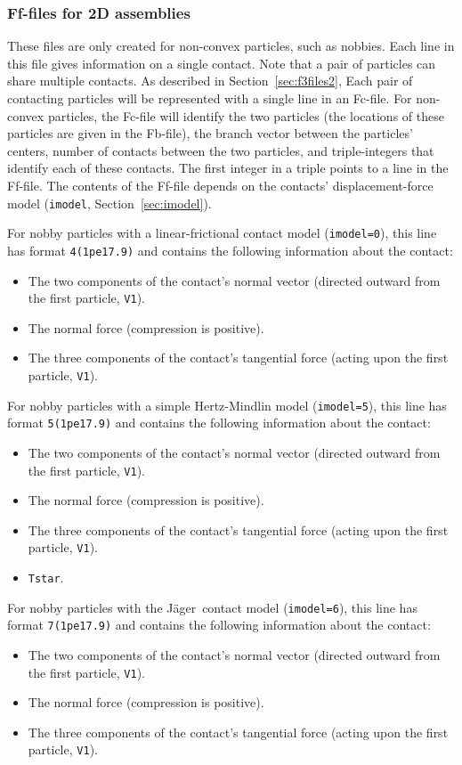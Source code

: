 \documentclass[letterpaper,11pt]{article}
\begin{document}
\subsubsection{Ff-files for 2D assemblies}\label{sec:f6files2d}
These files are only created for non-convex particles, such
as nobbies.
Each line in this file gives information on a single contact.
Note that a pair of particles can share multiple contacts.
As described in Section~\ref{sec:f3files2},
Each pair of contacting particles will be represented with a 
single line in an Fc-file.
For non-convex particles, the Fc-file will identify the two particles
(the locations of these particles are given in the Fb-file), 
the branch vector between the particles' centers, 
number of contacts between the two particles,
and triple-integers that identify each of these contacts.
The first integer in a triple points to a line in the Ff-file.
The contents of the Ff-file depends on the contacts'
displacement-force model (\texttt{imodel}, Section~\ref{sec:imodel}).
%
\par
For nobby particles with a linear-frictional contact
model (\texttt{imodel=0}), 
this line has format \texttt{4(1pe17.9)}
and contains the following information about the contact:
\begin{itemize}
\item
The two components of the contact's normal vector (directed outward
from the first particle, \texttt{V1}).
\item
The normal force (compression is positive).
\item
The three components of the contact's tangential force
(acting upon the first particle, \texttt{V1}).
\end{itemize}
%
\par
For nobby particles with a simple Hertz-Mindlin
model (\texttt{imodel=5}), 
this line has format \texttt{5(1pe17.9)}
and contains the following information about the contact:
\begin{itemize}
\item
The two components of the contact's normal vector (directed outward
from the first particle, \texttt{V1}).
\item
The normal force (compression is positive).
\item
The three components of the contact's tangential force
(acting upon the first particle, \texttt{V1}).
\item
\texttt{Tstar}.
\end{itemize}
%
\par
For nobby particles with the J\"{a}ger\ contact
model (\texttt{imodel=6}), 
this line has format \texttt{7(1pe17.9)}
and contains the following information about the contact:
\begin{itemize}
\item
The two components of the contact's normal vector (directed outward
from the first particle, \texttt{V1}).
\item
The normal force (compression is positive).
\item
The three components of the contact's tangential force
(acting upon the first particle, \texttt{V1}).
\end{itemize}
%
\end{document}
